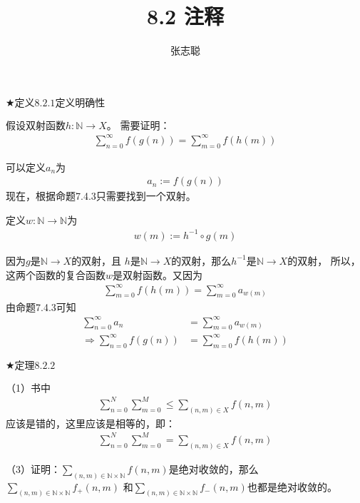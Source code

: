 \documentclass{article}
\begin{document}
\title{8.2 注释}
\author{张志聪}
\maketitle

$\bigstar \textbf{定义}8.2.1 \textbf{定义明确性}$

假设双射函数$h: \mathbb{N} \rightarrow X$。
需要证明：
\begin{align*}
    \sum \limits_{n=0}^\infty f(g(n)) = \sum \limits_{m=0}^\infty f(h(m))
\end{align*}

可以定义$a_n$为
\begin{align*}
    a_n := f(g(n))
\end{align*}
现在，根据命题7.4.3只需要找到一个双射。

定义$w: \mathbb{N} \rightarrow \mathbb{N}$为
\begin{align*}
    w(m) := h^{-1} \circ g(m)
\end{align*}

因为$g$是$\mathbb{N} \rightarrow X$的双射，且
$h$是$\mathbb{N} \rightarrow X$的双射，那么$h^{-1}$是$\mathbb{N} \rightarrow X$的双射，
所以，这两个函数的复合函数$w$是双射函数。又因为
\begin{align*}
    \sum \limits_{m=0}^\infty f(h(m)) = \sum \limits_{m=0}^\infty a_{w(m)}
\end{align*}
由命题7.4.3可知
\begin{align*}
    \sum \limits_{n=0}^\infty a_n                 & = \sum \limits_{m=0}^\infty a_{w(m)} \\
    \Rightarrow \sum \limits_{n=0}^\infty f(g(n)) & = \sum \limits_{m=0}^\infty f(h(m))
\end{align*}


$\bigstar \textbf{定理}8.2.2$

（1）书中
\begin{align*}
    \sum \limits_{n=0}^N \sum \limits_{m=0}^M \leq \sum \limits_{(n,m) \in X}f(n,m)
\end{align*}
应该是错的，这里应该是相等的，即：
\begin{align*}
    \sum \limits_{n=0}^N \sum \limits_{m=0}^M = \sum \limits_{(n,m) \in X}f(n,m)
\end{align*}

（3）证明：$\sum \limits_{(n,m) \in \mathbb{N} \times \mathbb{N}}f(n,m)$是绝对收敛的，那么
$\sum \limits_{(n,m) \in \mathbb{N} \times \mathbb{N}}f_{+}(n,m)$
和$\sum \limits_{(n,m) \in \mathbb{N} \times \mathbb{N}}f_{-}(n,m)$也都是绝对收敛的。
\end{document}
